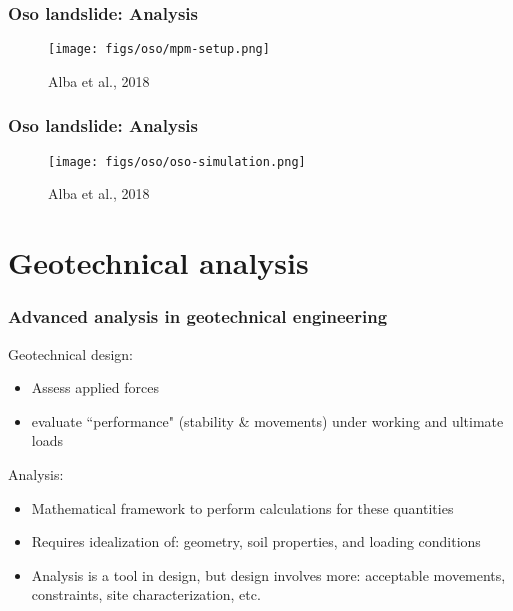\documentclass[handout]{beamer}
\begin{document}
\begin{frame}
	\frametitle{Oso landslide: Analysis}
	\begin{figure}
		\texttt{[image: figs/oso/mpm-setup.png]}
		\caption*{Alba et al., 2018}
	\end{figure}
\end{frame}

\begin{frame}
	\frametitle{Oso landslide: Analysis}
	\begin{figure}
		\texttt{[image: figs/oso/oso-simulation.png]}
		\caption*{Alba et al., 2018}
	\end{figure}
\end{frame}

\section{Geotechnical analysis}
\begin{frame}
\frametitle{Advanced analysis in geotechnical engineering}
Geotechnical design:

	\begin{itemize}
		\item Assess applied forces
		\item evaluate ``performance" (stability \& movements) under working and ultimate loads
	\end{itemize}

Analysis:

	\begin{itemize}
		\item Mathematical framework to perform calculations for these quantities
		\item Requires idealization of: geometry, soil properties, and loading conditions
		\item Analysis is a tool in design, but design involves more: acceptable movements, constraints, site characterization, etc.
	\end{itemize}

\end{frame}
\end{document}
